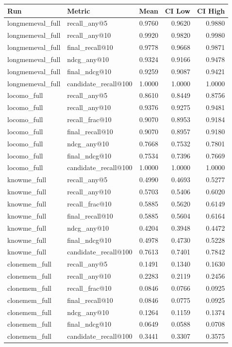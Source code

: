 \begin{tabular}{llrrr}
\toprule
Run & Metric & Mean & CI Low & CI High \\
\midrule
longmemeval\_full & recall\_any@5 & 0.9760 & 0.9620 & 0.9880 \\
longmemeval\_full & recall\_any@10 & 0.9920 & 0.9820 & 0.9980 \\
longmemeval\_full & final\_recall@10 & 0.9778 & 0.9668 & 0.9871 \\
longmemeval\_full & ndcg\_any@10 & 0.9324 & 0.9166 & 0.9478 \\
longmemeval\_full & final\_ndcg@10 & 0.9259 & 0.9087 & 0.9421 \\
longmemeval\_full & candidate\_recall@100 & 1.0000 & 1.0000 & 1.0000 \\
locomo\_full & recall\_any@5 & 0.8610 & 0.8449 & 0.8756 \\
locomo\_full & recall\_any@10 & 0.9376 & 0.9275 & 0.9481 \\
locomo\_full & recall\_frac@10 & 0.9070 & 0.8953 & 0.9184 \\
locomo\_full & final\_recall@10 & 0.9070 & 0.8957 & 0.9180 \\
locomo\_full & ndcg\_any@10 & 0.7668 & 0.7532 & 0.7801 \\
locomo\_full & final\_ndcg@10 & 0.7534 & 0.7396 & 0.7669 \\
locomo\_full & candidate\_recall@100 & 1.0000 & 1.0000 & 1.0000 \\
knowme\_full & recall\_any@5 & 0.4990 & 0.4693 & 0.5277 \\
knowme\_full & recall\_any@10 & 0.5703 & 0.5406 & 0.6020 \\
knowme\_full & recall\_frac@10 & 0.5885 & 0.5620 & 0.6149 \\
knowme\_full & final\_recall@10 & 0.5885 & 0.5604 & 0.6164 \\
knowme\_full & ndcg\_any@10 & 0.4204 & 0.3948 & 0.4472 \\
knowme\_full & final\_ndcg@10 & 0.4978 & 0.4730 & 0.5228 \\
knowme\_full & candidate\_recall@100 & 0.7613 & 0.7401 & 0.7842 \\
clonemem\_full & recall\_any@5 & 0.1491 & 0.1340 & 0.1630 \\
clonemem\_full & recall\_any@10 & 0.2283 & 0.2119 & 0.2456 \\
clonemem\_full & recall\_frac@10 & 0.0846 & 0.0766 & 0.0925 \\
clonemem\_full & final\_recall@10 & 0.0846 & 0.0775 & 0.0925 \\
clonemem\_full & ndcg\_any@10 & 0.1264 & 0.1159 & 0.1374 \\
clonemem\_full & final\_ndcg@10 & 0.0649 & 0.0588 & 0.0708 \\
clonemem\_full & candidate\_recall@100 & 0.3441 & 0.3307 & 0.3575 \\
\bottomrule
\end{tabular}
